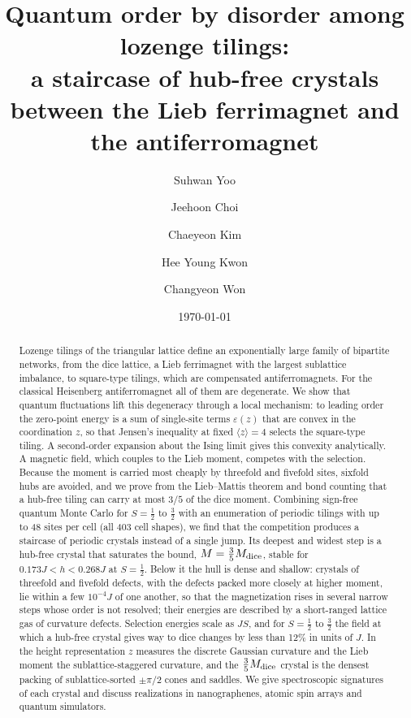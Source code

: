 \documentclass[prb,twocolumn,amsmath,amssymb,floatfix]{revtex4-2}
\newcommand{\Md}{M_{\rm dice}}
\newcommand{\eps}{\varepsilon}
\begin{document}
\title{Quantum order by disorder among lozenge tilings:\texorpdfstring{\\}{ }
a staircase of hub-free crystals between the Lieb ferrimagnet and the antiferromagnet}

\author{Suhwan Yoo}
\author{Jeehoon Choi}
\author{Chaeyeon Kim}
\author{Hee Young Kwon}
\author{Changyeon Won}

\date{\today}

\begin{abstract}
Lozenge tilings of the triangular lattice define an exponentially large family of bipartite networks, from the dice lattice, a Lieb ferrimagnet with the largest sublattice imbalance, to square-type tilings, which are compensated antiferromagnets. For the classical Heisenberg antiferromagnet all of them are degenerate. We show that quantum fluctuations lift this degeneracy through a local mechanism: to leading order the zero-point energy is a sum of single-site terms $\eps(z)$ that are convex in the coordination $z$, so that Jensen's inequality at fixed $\langle z\rangle=4$ selects the square-type tiling. A second-order expansion about the Ising limit gives this convexity analytically. A magnetic field, which couples to the Lieb moment, competes with the selection. Because the moment is carried most cheaply by threefold and fivefold sites, sixfold hubs are avoided, and we prove from the Lieb--Mattis theorem and bond counting that a hub-free tiling can carry at most $3/5$ of the dice moment. Combining sign-free quantum Monte Carlo for $S=\frac12$ to $\frac32$ with an enumeration of periodic tilings with up to 48 sites per cell (all 403 cell shapes), we find that the competition produces a staircase of periodic crystals instead of a single jump. Its deepest and widest step is a hub-free crystal that saturates the bound, $M=\frac35\Md$, stable for $0.173J<h<0.268J$ at $S=\frac12$. Below it the hull is dense and shallow: crystals of threefold and fivefold defects, with the defects packed more closely at higher moment, lie within a few $10^{-4}J$ of one another, so that the magnetization rises in several narrow steps whose order is not resolved; their energies are described by a short-ranged lattice gas of curvature defects. Selection energies scale as $JS$, and for $S=\frac12$ to $\frac32$ the field at which a hub-free crystal gives way to dice changes by less than 12\% in units of $J$. In the height representation $z$ measures the discrete Gaussian curvature and the Lieb moment the sublattice-staggered curvature, and the $\frac35\Md$ crystal is the densest packing of sublattice-sorted $\pm\pi/2$ cones and saddles. We give spectroscopic signatures of each crystal and discuss realizations in nanographenes, atomic spin arrays and quantum simulators.
\end{abstract}
\end{document}
